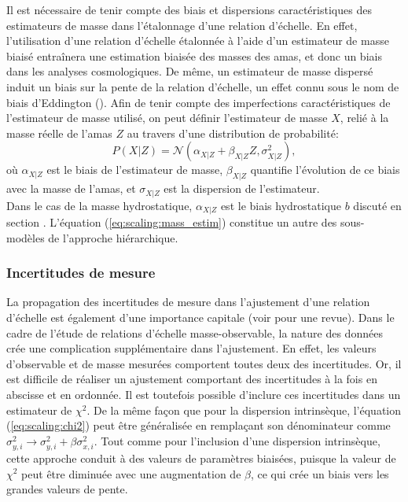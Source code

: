 Il est nécessaire de tenir compte des biais et dispersions caractéristiques des estimateurs de masse dans l'étalonnage d'une relation d'échelle.
En effet, l'utilisation d'une relation d'échelle étalonnée à l'aide d'un estimateur de masse biaisé entraînera une estimation biaisée des masses des amas, et donc un biais dans les analyses cosmologiques.
De même, un estimateur de masse dispersé induit un biais sur la pente de la relation d'échelle, un effet connu sous le nom de biais d'Eddington (\cite{eddington_formula_1913, eddington_correction_1940}).
Afin de tenir compte des imperfections caractéristiques de l'estimateur de masse utilisé, on peut définir l'estimateur de masse $X$, relié à la masse réelle de l'amas $Z$ au travers d'une distribution de probabilité:
\begin{equation}
    \label{eq:scaling:mass_estim}
    P(X|Z) = \mathcal{N} \left(\alpha_{X|Z} + \beta_{X|Z} Z, \sigma_{X|Z}^2\right),
\end{equation}
où $\alpha_{X|Z}$ est le biais de l'estimateur de masse, $\beta_{X|Z}$ quantifie l'évolution de ce biais avec la masse de l'amas, et $\sigma_{X|Z}$ est la dispersion de l'estimateur. \\
Dans le cas de la masse hydrostatique, $\alpha_{X|Z}$ est le biais hydrostatique $b$ discuté en section .
L'équation (\ref{eq:scaling:mass_estim}) constitue un autre des sous-modèles de l'approche hiérarchique. %

\subsubsection{Incertitudes de mesure} %

La propagation des incertitudes de mesure dans l'ajustement d'une relation d'échelle est également d'une importance capitale (voir \cite{andreon_measurement_2013} pour une revue).
Dans le cadre de l'étude de relations d'échelle masse-observable, la nature des données crée une complication supplémentaire dans l'ajustement.
En effet, les valeurs d'observable et de masse mesurées comportent toutes deux des incertitudes.
Or, il est difficile de réaliser un ajustement comportant des incertitudes à la fois en abscisse et en ordonnée.
Il est toutefois possible d'inclure ces incertitudes dans un estimateur de $\chi^2$.
De la même façon que pour la dispersion intrinsèque, l'équation (\ref{eq:scaling:chi2}) peut être généralisée en remplaçant son dénominateur comme $\sigma_{y,i}^2 \rightarrow \sigma_{y,i}^2 + \beta \sigma_{x, i}^2$.
Tout comme pour l'inclusion d'une dispersion intrinsèque, cette approche conduit à des valeurs de paramètres biaisées, puisque la valeur de $\chi^2$ peut être diminuée avec une augmentation de $\beta$, ce qui crée un biais vers les grandes valeurs de pente.

